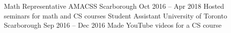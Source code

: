 \begin{cvhonors}
  \cvhonor
    {Math Representative}
    {AMACSS}
    {Scarborough}
    {Oct 2016 -- Apr 2018}
    {Hosted seminars for math and CS courses}
  \cvhonor
    {Student Assistant}
    {University of Toronto}
    {Scarborough}
    {Sep 2016 -- Dec 2016}
    {Made YouTube videos for a CS course}
\end{cvhonors}